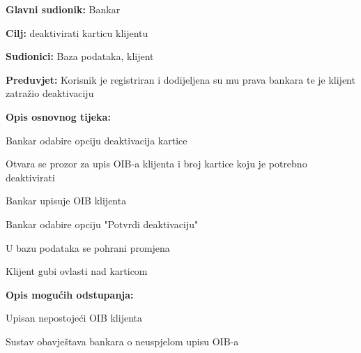                 
                \noindent {}
                \begin{packed_item}
                
                  \item \textbf{Glavni sudionik: }Bankar
                  \item  \textbf{Cilj:} deaktivirati karticu klijentu
                  \item  \textbf{Sudionici:} Baza podataka, klijent
                  \item  \textbf{Preduvjet:} Korisnik je registriran i dodijeljena su mu prava bankara te je klijent zatražio deaktivaciju
                  \item  \textbf{Opis osnovnog tijeka:}
                  
                  \item[] \begin{packed_enum}
                
                    \item Bankar odabire opciju deaktivacija kartice 
                    \item Otvara se prozor za upis OIB-a klijenta i broj kartice koju je potrebno deaktivirati
                    \item Bankar upisuje OIB klijenta 
                    \item Bankar odabire opciju "Potvrdi deaktivaciju"
                    \item U bazu podataka se pohrani promjena 
                    \item Klijent gubi ovlasti nad karticom
                  \end{packed_enum}
                  
                  \item  \textbf{Opis mogućih odstupanja:} 
                  
                  \item[] \begin{packed_item}
                
                    \item[2.a] Upisan nepostojeći OIB klijenta
                    \item[] \begin{packed_enum}
                      
                      \item Sustav obavještava bankara o neuspjelom upisu OIB-a
                      
                    \end{packed_enum}
                    
                  \end{packed_item}
                \end{packed_item}
                
